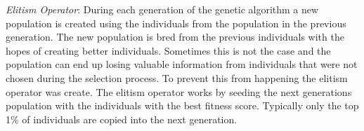 \textit{Elitism Operator}: During each generation of the genetic algorithm a new population is created using the individuals from the population in the previous generation. The new population is bred from the previous individuals with the hopes of creating better individuals. Sometimes this is not the case and the population can end up losing valuable information from individuals that were not chosen during the selection process. To prevent this from happening the elitism operator was create. The elitism operator works by seeding the next generations population with the individuals with the best fitness score. Typically only the top 1\% of individuals are copied into the next generation.